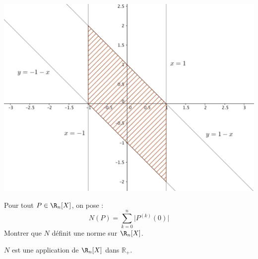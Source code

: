 \documentclass[a4paper,10pt]{report}
\begin{document}
\begin{enumerate}
\medskip

\begin{center}
\includegraphics[scale=0.4]{BouleU}
\end{center}
\end{enumerate}

\begin{Exa} Pour tout $P  \in \R_n[X ]$, on pose :
$$N(P) = \sum_{k = 0}^{ n } \vert P^{(k)} (0) \vert $$
Montrer que $N$ définit une norme sur $\R_n [X]$.
\end{Exa}

\corr $N$ est une application de $\R_n[X ]$ dans $\mathbb{R}_+$.
\end{document}
